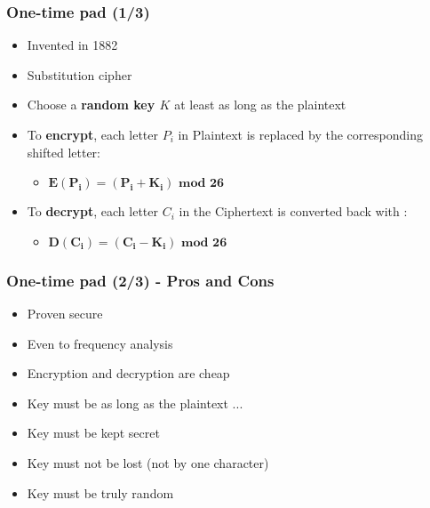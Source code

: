\documentclass[
hyperref={pdfpagelabels=false}
,xcolor=table
]
{beamer}
\newcommand{\plus}{{\texttt{[image: plus.png]}}}
\newcommand{\minus}{{\texttt{[image: minus.png]}}}
\begin{document}
\begin{frame}
  \frametitle{One-time pad (1/3)}
  \begin{itemize}
  \item Invented in 1882
  \item Substitution cipher
  \item Choose a \textbf{random key $K$} \alert{at least as long as the plaintext}
  \item To \textbf{encrypt}, each letter $P_i$ in Plaintext is replaced by the corresponding shifted letter:
    \begin{itemize}
    \item[] $\bm{E(P_i) = (P_i + K_i) \mbox{ mod } 26}$
    \end{itemize}
  \item To \textbf{decrypt}, each letter $C_i$ in the Ciphertext is converted back with :
    \begin{itemize}
    \item[] $\bm{D(C_i) = (C_i - K_i) \mbox{ mod } 26}$ 
    \end{itemize} 
  \end{itemize}
  
\end{frame}


\begin{frame}
  \frametitle{One-time pad  (2/3) - Pros and Cons }

  \begin{itemize}
  \item[\plus] Proven secure
  \item[\plus] Even to frequency analysis
  \item[\plus] Encryption and decryption are cheap
  \item[\minus] Key must be as long as the plaintext ... 
  \item[\minus] Key must be kept secret
  \item[\minus] Key must not be lost (not by one character)  
  \item[\minus] Key must be truly random 
  \end{itemize}
\end{frame}
\end{document}
